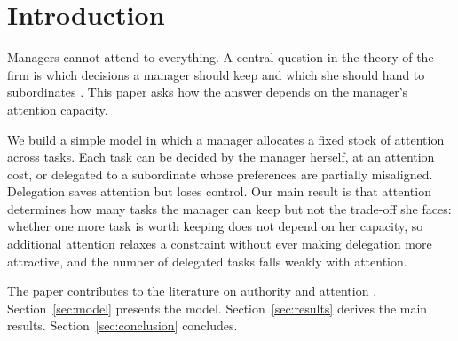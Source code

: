 \section{Introduction}
\label{sec:intro}

Managers cannot attend to everything. A central question in the theory of the firm is which decisions a manager should keep and which she should hand to subordinates \citep{aghion1997formal, dessein2002authority}. This paper asks how the answer depends on the manager's attention capacity.

We build a simple model in which a manager allocates a fixed stock of attention across tasks. Each task can be decided by the manager herself, at an attention cost, or delegated to a subordinate whose preferences are partially misaligned. Delegation saves attention but loses control. Our main result is that attention determines how many tasks the manager can keep but not the trade-off she faces: whether one more task is worth keeping does not depend on her capacity, so additional attention relaxes a constraint without ever making delegation more attractive, and the number of delegated tasks falls weakly with attention.

The paper contributes to the literature on authority and attention \citep{garicano2000hierarchies}. Section~\ref{sec:model} presents the model. Section~\ref{sec:results} derives the main results. Section~\ref{sec:conclusion} concludes.
